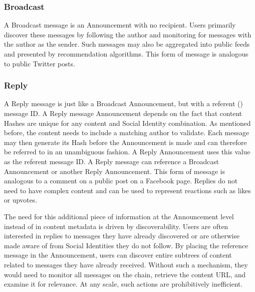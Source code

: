 \documentclass[12pt,letterpaper]{article}
\begin{document}
\subsubsection{Broadcast}

A Broadcast message is an Announcement with no recipient. Users primarily discover these
messages by following the author and monitoring for messages with the author as the
sender. Such messages may also be aggregated into public feeds and presented by
recommendation algorithms. This form of message is analogous to public Twitter posts.

\subsubsection{Reply}

A Reply message is just like a Broadcast Announcement, but with a referent () message ID. A Reply message Announcement depends on the fact that content Hashes are
unique for any content and Social Identity combination. As mentioned before, the content
needs to include a matching author to validate. Each message may then generate its Hash
before the Announcement is made and can therefore be referred to in an unambiguous
fashion. A Reply Announcement uses this value as the referent message ID. A Reply message
can reference a Broadcast Announcement or another Reply Announcement. This form of message
is analogous to a comment on a public post on a Facebook page. Replies do not need to have
complex content and can be used to represent reactions such as likes or upvotes.

The need for this additional piece of information at the Announcement level instead of in
content metadata is driven by discoverability. Users are often interested in replies to
messages they have already discovered or are otherwise made aware of from Social Identities
they do not follow. By placing the reference message in the Announcement, users can discover
entire subtrees of content related to messages they have already received.  Without such a
mechanism, they would need to monitor all messages on the chain, retrieve the content URL,
and examine it for relevance. At any scale, such actions are prohibitively inefficient.
\end{document}
